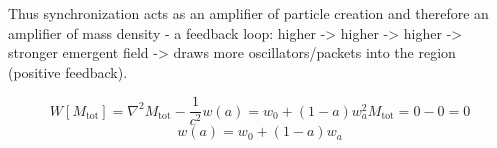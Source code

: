 
\begin{tzpsnapshot}
\end{tzpsnapshot}

Thus synchronization acts as an amplifier of particle creation and therefore an amplifier of mass density - a feedback loop: higher -> higher -> higher -> stronger emergent field -> draws more oscillators/packets into the region (positive feedback).

\[
W[M_{\text{tot}}] = \nabla^2 M_{\text{tot}} - \frac{1}{c^2}w(a) = w_0 + (1-a)w_a^2 M_{\text{tot}} = 0 - 0 = 0
\]
\[
w(a) = w_0 + (1-a)w_a
\]

